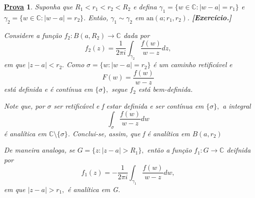 \documentclass{article}
\newtheorem*{proof*}{\underline{Prova}}
\begin{document}
  \begin{proof*}
    Suponha que \(R_{1} < r_{1} < r_{2} < R_{2}\) e defina \(\gamma_{1} = \{w \in \mathbb{C}:|w -a| = r_{1}\}\) e \(\gamma_{2} = \{w \in \mathbb{C}:|w -a|=r_{2}\}\).
    Então, \(\gamma_{1}\sim \gamma _{2}\) em \(\mathrm{an}(a; r_{1}, r_{2})\). \textbf{[Exercício.]}

    Considere a função \(f_{2}:B(a, R_{2})\rightarrow \mathbb{C}\) dada por 
    \[
      f_{2}(z) = \frac{1}{2\pi i} \int_{\gamma_{2}}^{}\frac{f(w)}{w-z}dz,
    \]
    em que \(|z-a| < r_{2}.\) Como \(\sigma = \{w: |w - a| = r_{2}\}\) é um caminho retificável e 
    \[
      F(w) = \frac{f(w)}{w-z}
    \]
    está definida e é contínua em \(\{\sigma \},\) segue \(f_{2}\) está bem-definida.

    Note que, por \(\sigma \) ser retificável e f estar definida e ser contínua em \(\{\sigma \},\) a integral 
    \[
      \int_{\sigma }^{}\frac{f(w)}{w-z}dw
    \]
    é analítica em \(\mathbb{C}\setminus{\{\sigma \}}\). Conclui-se, assim, que f é analítica em \(B(a, r_{2})\)

    De maneira analoga, se \(G = \{z: |z-a| > R_{1}\},\) então a função \(f_{1}:G\rightarrow \mathbb{C}\) deifnida por 
    \[
      f_{1}(z) = -\frac{1}{2\pi i}\int_{\gamma_{1}}^{}\frac{f(w)}{w-z}dw,
    \]
    em que \(|z-a| > r_{1},\) é analítica em G.


\end{proof*}
\end{document}

